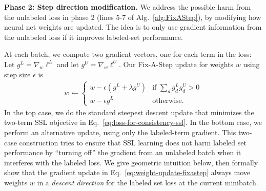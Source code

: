 

\textbf{Phase 2: Step direction modification.}
We address the possible harm from the unlabeled loss in phase 2 (lines 5-7 of Alg.~\ref{alg:FixAStep}), by modifying how neural net weights are updated.
The idea is to only use gradient information from the unlabeled loss if it improves labeled-set performance. 

At each batch, we compute two gradient vectors, one for each term in the loss: Let $g^L = \nabla_w \ell^L$ and let $g^U = \nabla_w \ell^U$.
Our Fix-A-Step update for weights $w$ using step size $\epsilon$ is
\begin{align}
w \gets \begin{cases}
 	w - \epsilon (g^L + \lambda g^U) \!\!\! &\text{if~} \sum_d g^L_d g^U_d > 0
 	\\
 	w - \epsilon g^L & \text{otherwise}.
 \end{cases}	
 \label{eq:weight-update-fixastep}
\end{align}
In the top case, we do the standard steepest descent update that minimizes the two-term SSL objective in Eq.~\eqref{eq:loss-for-consistency-ssl}.
In the bottom case, we perform an alternative update, using only the labeled-term gradient.
This two-case construction tries to ensure that SSL learning does not harm labeled set performance by ``turning off'' the gradient from an unlabeled batch when it interferes with the labeled loss.
We give geometric intuition below, then formally show that the gradient update in Eq.~\eqref{eq:weight-update-fixastep} always move weights $w$ in a \emph{descent direction} for the labeled set loss at the current minibatch.

